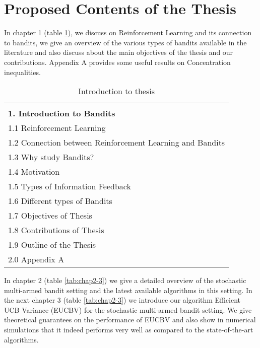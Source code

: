 \documentclass[MS,synopsis]{iitmdiss}
\begin{document}

\section{Proposed Contents of the Thesis}

In chapter 1 (table \ref{tab:chap1}), we discuss on Reinforcement Learning and its connection to bandits, we give an overview of the various types of bandits available in the literature and also discuss about the main objectives of the thesis and our contributions. Appendix A provides some useful results on Concentration inequalities. 


\begin{table}[!th]
\begin{center}
\begin{tabular}{|p{26em}|}
\hline\\
\textbf{1. Introduction to Bandits} \\\hline
1.1 Reinforcement Learning \\
1.2 Connection between Reinforcement Learning and Bandits \\
1.3 Why study Bandits?\\
1.4 Motivation \\
1.5 Types of Information Feedback\\
1.6 Different types of Bandits\\
1.7 Objectives of Thesis\\
1.8 Contributions of Thesis\\
1.9 Outline of the Thesis\\
2.0 Appendix A\\
\hline
\end{tabular}
\end{center}
\caption{Introduction to thesis}
\label{tab:chap1}
\end{table}


In chapter 2 (table \ref{tab:chap2-3}) we give a detailed overview of the stochastic multi-armed bandit setting and the latest available algorithms in this setting. In the next chapter 3 (table \ref{tab:chap2-3}) we introduce our algorithm Efficient UCB Variance (EUCBV) for the stochastic multi-armed bandit setting. We give theoretical guarantees on the performance of EUCBV and also show in numerical simulations that it indeed performs very well as compared to the state-of-the-art algorithms. 
\end{document}

